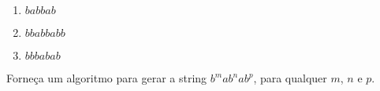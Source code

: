 \documentclass[12pt]{article}
\begin{document}
\begin{enumerate}
\begin{enumerate}

\item $babbab$

\item $bbabbabb$

\item $bbbabab$

\end{enumerate}

Forneça um algoritmo para gerar a string $b^mab^nab^p$, para qualquer $m$, $n$ e $p$.




\end{enumerate}
\end{document}

